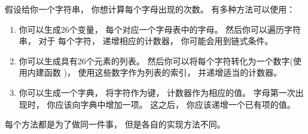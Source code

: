 
假设给你一个字符串， 你想计算每个字母出现的次数。
有多种方法可以使用：


\begin{enumerate}

\item 你可以生成26个变量， 每个对应一个字母表中的字母。  然后你可以遍历字符串， 对于 每个字符， 递增相应的计数器， 你可能会用到链式条件。

\item 你可以生成具有26个元素的列表。   然后你可以将每个字符转化为一个数字(使用内建函数  )， 使用这些数字作为列表的索引， 并递增适当的计数器。

\item 你可以生成一个字典， 将字符作为键， 计数器作为相应的值。  字母第一次出现时， 你应该向字典中增加一项。   这之后， 你应该递增一个已有项的值。

\end{enumerate}


每个方法都是为了做同一件事， 但是各自的实现方法不同。



